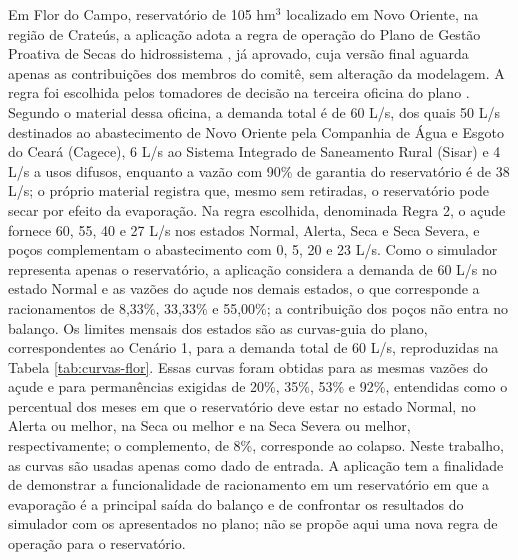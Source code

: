 Em Flor do Campo, reservatório de 105 hm$^3$ localizado em Novo Oriente, na região de Crateús, a aplicação adota a regra de operação do Plano de Gestão Proativa de Secas do hidrossistema \cite{pgpsFlorDoCampo2026}, já aprovado, cuja versão final aguarda apenas as contribuições dos membros do comitê, sem alteração da modelagem. A regra foi escolhida pelos tomadores de decisão na terceira oficina do plano \cite{oficinaFlorDoCampo2026}. Segundo o material dessa oficina, a demanda total é de 60 L/s, dos quais 50 L/s destinados ao abastecimento de Novo Oriente pela Companhia de Água e Esgoto do Ceará (Cagece), 6 L/s ao Sistema Integrado de Saneamento Rural (Sisar) e 4 L/s a usos difusos, enquanto a vazão com 90\% de garantia do reservatório é de 38 L/s; o próprio material registra que, mesmo sem retiradas, o reservatório pode secar por efeito da evaporação. Na regra escolhida, denominada Regra 2, o açude fornece 60, 55, 40 e 27 L/s nos estados Normal, Alerta, Seca e Seca Severa, e poços complementam o abastecimento com 0, 5, 20 e 23 L/s. Como o simulador representa apenas o reservatório, a aplicação considera a demanda de 60 L/s no estado Normal e as vazões do açude nos demais estados, o que corresponde a racionamentos de 8,33\%, 33,33\% e 55,00\%; a contribuição dos poços não entra no balanço. Os limites mensais dos estados são as curvas-guia do plano, correspondentes ao Cenário 1, para a demanda total de 60 L/s, reproduzidas na Tabela \ref{tab:curvas-flor}. Essas curvas foram obtidas para as mesmas vazões do açude e para permanências exigidas de 20\%, 35\%, 53\% e 92\%, entendidas como o percentual dos meses em que o reservatório deve estar no estado Normal, no Alerta ou melhor, na Seca ou melhor e na Seca Severa ou melhor, respectivamente; o complemento, de 8\%, corresponde ao colapso. Neste trabalho, as curvas são usadas apenas como dado de entrada. A aplicação tem a finalidade de demonstrar a funcionalidade de racionamento em um reservatório em que a evaporação é a principal saída do balanço e de confrontar os resultados do simulador com os apresentados no plano; não se propõe aqui uma nova regra de operação para o reservatório.

